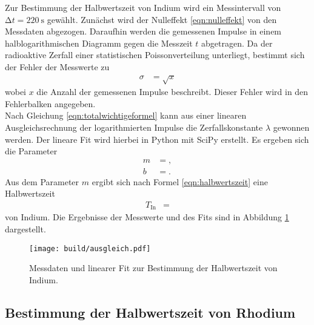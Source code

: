 Zur Bestimmung der Halbwertszeit von Indium wird ein Messintervall von $\increment t = \SI{220}{\second}$ gewählt.
Zunächst wird der Nulleffekt \eqref{eqn:nulleffekt} von den Messdaten abgezogen.
Daraufhin werden die gemessenen Impulse in einem halblogarithmischen Diagramm gegen die Messzeit $t$ abgetragen.
Da der radioaktive Zerfall einer statistischen Poissonverteilung unterliegt, bestimmt sich der Fehler der Messwerte zu
\begin{align*}
  \sigma &= \sqrt{x}
\end{align*}
wobei $x$ die Anzahl der gemessenen Impulse beschreibt.
Dieser Fehler wird in den Fehlerbalken angegeben.\\
Nach Gleichung \eqref{eqn:totalwichtigeformel} kann aus einer linearen Ausgleichsrechnung der logarithmierten Impulse die Zerfallskonstante $\lambda$ gewonnen werden.
Der lineare Fit wird hierbei in Python mit SciPy erstellt.
Es ergeben sich die Parameter
\begin{align*}
  m &= , \\
  b &= .
\end{align*}
Aus dem Parameter $m$ ergibt sich nach Formel \eqref{eqn:halbwertszeit} eine Halbwertszeit
\begin{align*}
  T_\text{In} &= 
\end{align*}
von Indium.
Die Ergebnisse der Messwerte und des Fits sind in Abbildung \ref{fig:plot1} dargestellt.

\begin{figure}
  \centering
  \texttt{[image: build/ausgleich.pdf]}
  \caption{Messdaten und linearer Fit zur Bestimmung der Halbwertszeit von Indium.}
  \label{fig:plot1}
\end{figure}

\subsection{Bestimmung der Halbwertszeit von Rhodium}

